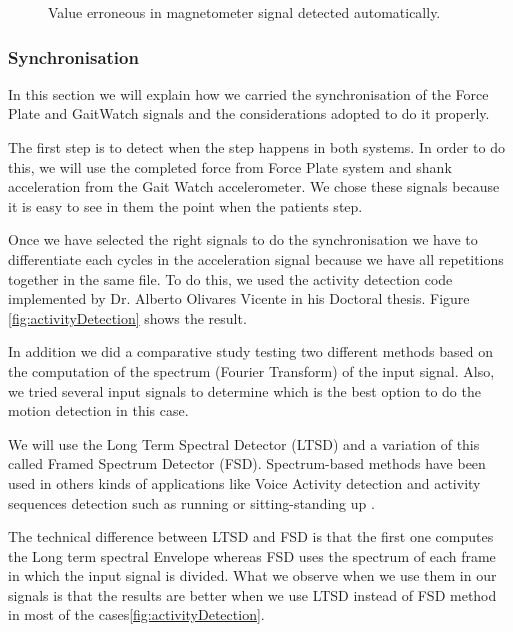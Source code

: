\begin{figure}[H]
	\centering
	\caption{Value erroneous in magnetometer signal detected automatically.}
	\label{fig:GWErrorDetected}
	\end{figure}



\subsubsection{Synchronisation}	
In this section we will explain how we carried the synchronisation of the Force Plate and GaitWatch signals and the considerations adopted to do it properly.

The first step is to detect when the step happens in both systems. In order to do this, we will use the completed force from Force Plate system and shank acceleration from the Gait Watch accelerometer. We chose these signals because it is easy to see in them the point when the patients step.

Once we have selected the right signals to do the synchronisation we have to differentiate each cycles in the acceleration signal because we have all repetitions together in the same file. To do this, we used the activity detection code implemented by Dr. Alberto Olivares Vicente in his Doctoral thesis. Figure \ref{fig:activityDetection} shows the result.

In addition we did a comparative study testing two different methods based on the  computation of the spectrum (Fourier Transform) of the input signal. Also, we tried several input signals to determine which is the best option to do the motion detection in this case.

We will use the Long Term Spectral Detector (LTSD) \cite{Ramirez2004} and a variation of this called Framed Spectrum Detector (FSD). Spectrum-based methods have been used in others kinds of applications like Voice Activity detection \cite{Ramirez2006}\cite{Ramirez2007} and activity sequences detection such as running or sitting-standing up\cite{A.Olivares2013} .

The technical difference between LTSD and FSD is that the first one computes the Long term spectral Envelope whereas FSD uses the spectrum of each frame  in which the input signal is divided\cite{A.Olivares2013}. What we observe when we use them in our signals is that the results are better when we use LTSD instead of FSD method in most of the cases\ref{fig:activityDetection}.

